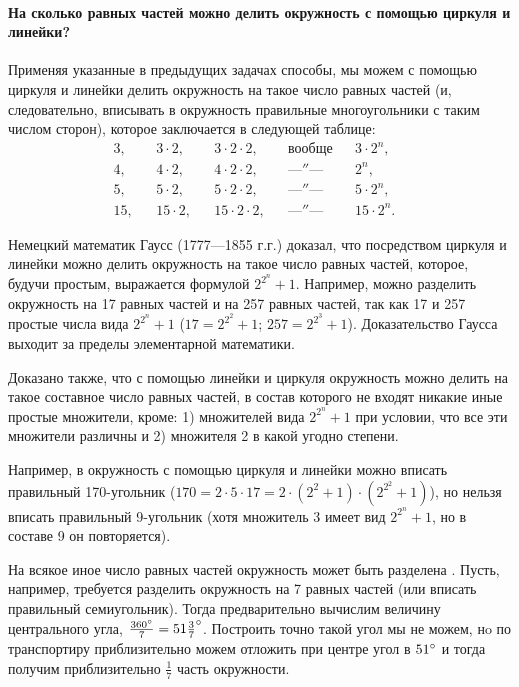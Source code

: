 \documentclass[oneside]{book}
\begin{document}
\paragraph{На сколько равных частей можно делить окружность с помощью циркуля и линейки?}\label{1938/225}
Применяя указанные в предыдущих задачах способы, мы можем с помощью циркуля и линейки делить окружность на такое число равных частей (и, следовательно, вписывать в окружность правильные многоугольники с таким числом сторон), которое заключается в следующей таблице:
\begin{align*}
3,&&3\cdot 2,&&3\cdot2\cdot2,&&\text{вообще}&&3\cdot 2^n,&
\\
4,&&4\cdot 2,&&4\cdot2\cdot2,&&\text{---″---\ \ }&&2^n,&
\\
5,&&5\cdot 2,&&5\cdot2\cdot2,&&\text{---″---\ \ }&&5\cdot 2^n,&
\\
15,&&15\cdot 2,&&15\cdot2\cdot2,&&\text{---″---\ \ }&&15\cdot 2^n.&
\end{align*}

Немецкий математик Гаусс (1777---1855 г.г.) доказал, что посредством циркуля и линейки можно делить окружность на такое число равных частей, которое, будучи простым, выражается формулой $2^{2^n} + 1$.
Например, можно разделить окружность на 17 равных частей и на 257 равных частей, так как 17 и 257 простые числа вида $2^{2^n} + 1$ 
($17 = 2^{2^2} + 1$;
$257 = 2^{2^3} + 1$).
Доказательство Гаусса выходит за пределы элементарной математики.

Доказано также, что с помощью линейки и циркуля окружность можно делить на такое составное число равных частей, в состав которого не входят никакие иные простые множители, кроме:
1) множителей вида $2^{2^n} + 1$ при условии, что все эти множители различны 
и 
2) множителя 2 в какой угодно степени.

Например, в окружность с помощью циркуля и линейки можно вписать правильный 170-угольник ($170 = 2 \cdot 5 \cdot 17 = 2 \cdot (2^2 + 1) \cdot (2^{2^2} +1)$),
но нельзя вписать правильный 9-угольник (хотя множитель 3 имеет вид $2^{2^n} + 1$, но в составе 9 он повторяется).

На всякое иное число равных частей окружность может быть разделена .
Пусть, например, требуется разделить окружность на 7 равных частей (или вписать правильный семиугольник).
Тогда предварительно вычислим величину центрального угла,
$\frac{360\degree}7=51\tfrac37\degree$.
Построить точно такой угол мы не можем, нo по транспортиру приблизительно можем отложить при центре угол в $51\degree$ и тогда получим приблизительно $\tfrac17$ часть окружности.
\end{document}
